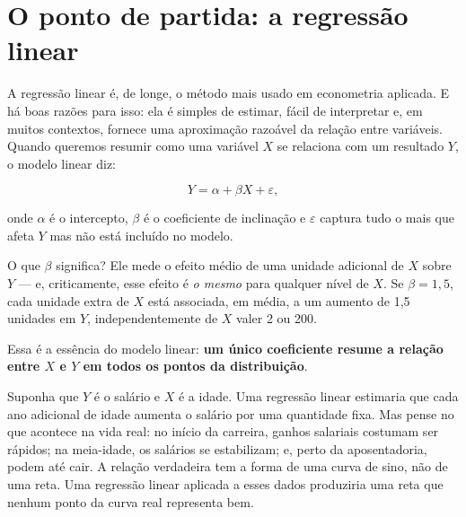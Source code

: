 
\chapter{O ponto de partida: a regressão linear}

A regressão linear é, de longe, o método mais usado em econometria aplicada. E há boas
razões para isso: ela é simples de estimar, fácil de interpretar e, em muitos contextos,
fornece uma aproximação razoável da relação entre variáveis. Quando queremos resumir como
uma variável $X$ se relaciona com um resultado $Y$, o modelo linear diz:

\begin{equation}
Y = \alpha + \beta X + \varepsilon,
\label{eq:linear}
\end{equation}

\noindent
onde $\alpha$ é o intercepto, $\beta$ é o coeficiente de inclinação e $\varepsilon$
captura tudo o mais que afeta $Y$ mas não está incluído no modelo.

O que $\beta$ significa? Ele mede o efeito médio de uma unidade adicional de $X$ sobre
$Y$ — e, criticamente, esse efeito é \emph{o mesmo} para qualquer nível de $X$. Se
$\beta = 1{,}5$, cada unidade extra de $X$ está associada, em média, a um aumento de
1,5 unidades em $Y$, independentemente de $X$ valer 2 ou 200.

Essa é a essência do modelo linear: \textbf{um único coeficiente resume a relação
entre $X$ e $Y$ em todos os pontos da distribuição}.

\begin{exemplobox}
Suponha que $Y$ é o salário e $X$ é a idade. Uma regressão linear estimaria que cada
ano adicional de idade aumenta o salário por uma quantidade fixa. Mas pense no que
acontece na vida real: no início da carreira, ganhos salariais costumam ser rápidos;
na meia-idade, os salários se estabilizam; e, perto da aposentadoria, podem até cair.
A relação verdadeira tem a forma de uma curva de sino, não de uma reta. Uma regressão
linear aplicada a esses dados produziria uma reta que nenhum ponto da curva real
representa bem.
\end{exemplobox}

